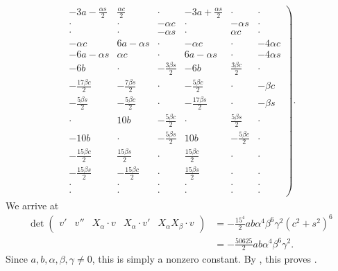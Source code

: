 \documentclass[a4paper,10pt,leqno]{article}
\numberwithin{equation}{section}
\theoremstyle{plain}
\theoremstyle{definition}
\theoremstyle{remark}
\newcommand{\mat}[1]{\begin{matrix}#1\end{matrix}}
\newcommand{\pmat}[1]{\left(\mat{#1}\right)}
\begin{document}
\begin{align} 
\left.\begin{matrix}
-3a-\frac{\alpha s}{2}&\frac{\alpha c}{2}&\cdot&-3a+\frac{\alpha s}{2}&\cdot&\cdot\\
\cdot&\cdot&-\alpha c&\cdot&-\alpha s&\cdot\\
\cdot&\cdot&-\alpha s&\cdot&\alpha c&\cdot\\
-\alpha c&6a-\alpha s&\cdot&-\alpha c&\cdot&-4\alpha c\\
-6a-\alpha s&\alpha c&\cdot&6a-\alpha s&\cdot&-4\alpha s\\
-6b&\cdot&-\frac{3\beta s}{2}&-6b&\frac{3\beta c}{2}&\cdot\\
-\frac{17\beta c}{2}&-\frac{7\beta s}{2}&\cdot&-\frac{5\beta c}{2}&\cdot&-\beta c\\
-\frac{5\beta s}{2}&-\frac{5\beta c}{2}&\cdot&-\frac{17\beta s}{2}&\cdot&-\beta s\\
\cdot&10b&-\frac{5\beta c}{2}&\cdot&\frac{5\beta s}{2}&\cdot\\
-10b&\cdot&-\frac{5\beta s}{2}&10b&-\frac{5\beta c}{2}&\cdot\\
-\frac{15\beta c}{2}&\frac{15\beta s}{2}&\cdot&\frac{15\beta c}{2}&\cdot&\cdot\\
-\frac{15\beta s}{2}&-\frac{15\beta c}{2}&\cdot&\frac{15\beta s}{2}&\cdot&\cdot\\
\cdot&\cdot&\cdot&\cdot&\cdot&\cdot\\
\cdot&\cdot&\cdot&\cdot&\cdot&\cdot
\end{matrix}\right).
\end{align} 
We arrive at
\begin{align}
\det \pmat{v' &v'' &X_\alpha \cdot v &X_\alpha \cdot v' &X_\alpha X_\beta \cdot v}
	&= -\frac{15^4}{2} ab \alpha^4 \beta^6 \gamma^2 (c^2 + s^2)^6\\[1ex]
	&= -\frac{50625}{2} ab \alpha^4 \beta^6 \gamma^2.
\end{align}
Since $a, b, \alpha, \beta, \gamma \neq 0$, this is simply a nonzero constant.
By , this proves .
\end{document}
